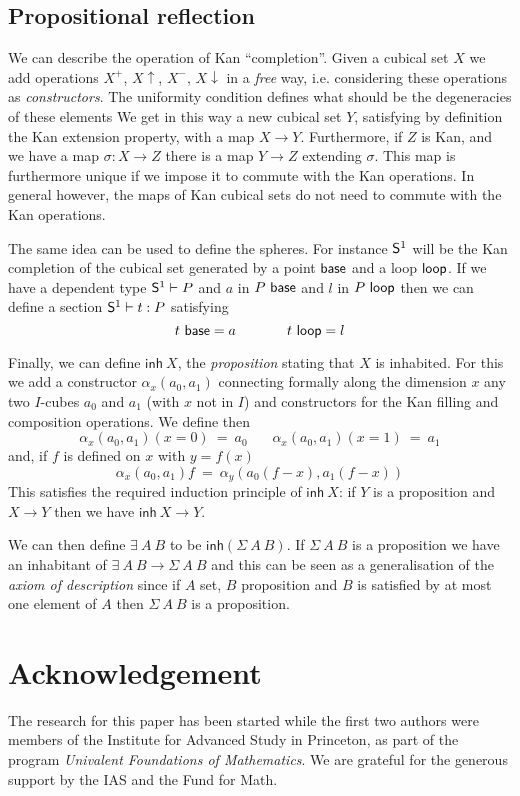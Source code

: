 \documentclass[10pt,a4paper]{article}
\newcommand{\inh}{\mathsf{inh}}
\newcommand{\Sph}{{\sf S}^1}
\begin{document}
\subsection{Propositional reflection}

 We can describe the operation of Kan ``completion''. Given a cubical set $X$ we add
operations $X^+$, $X\uparrow$, $X^-$, $X\downarrow$ in a {\em free} way, i.e.
considering these operations as {\em constructors}.
 The uniformity condition defines what should be the degeneracies of these elements
We get in this way a new cubical set $Y$, satisfying by definition the Kan extension
property, with a map $X\to Y$. Furthermore, if $Z$ is Kan, and we have a map
$\sigma:X\to Z$ there is a map $Y\to Z$ extending $\sigma$.
This map is furthermore unique if we impose
it to commute with the Kan  operations.
In general however, the maps of Kan cubical sets do not need to commute with the Kan operations.

 The same idea can be used to define the spheres. For instance $\Sph$ will be the
Kan completion of the cubical set generated by a point ${\sf base}$ and a loop ${\sf loop}$.
If we have a dependent type $\Sph\vdash P$ and $a$ in $P~{\sf base}$ and $l$ in $P~{\sf loop}$
then we can define a section $\Sph\vdash t:P$ satisfying
$$
t~{\sf base} = a~~~~~~~~~~~t~{\sf loop} = l
$$

 Finally, we can define $\inh~X$, the {\em proposition} stating that $X$ is inhabited.
For this we add a constructor $\alpha_x(a_0,a_1)$ connecting formally along the dimension $x$
any two $I$-cubes  $a_0$ and $a_1$ (with $x$ not in $I$) and constructors for the Kan filling
and composition operations. We define then
$$\alpha_x(a_0,a_1)(x=0) ~=~ a_0~~~~~~~~\alpha_x(a_0,a_1)(x=1) ~=~ a_1$$
and, if $f$ is defined on $x$ with $y=f(x)$
$$\alpha_x(a_0,a_1)f ~=~ \alpha_y(a_0(f-x),a_1(f-x))$$
 This satisfies the required induction principle of $\inh~X$: if $Y$ is a proposition
and $X\to Y$ then we have $\inh~X\to Y$.

 We can then define $\exists~A~B$ to be $\inh(\Sigma~A~B)$. If $\Sigma~A~B$ is a proposition we have
an inhabitant of $\exists~A~B\to \Sigma~ A~B$ and this can be seen as a generalisation of
the {\em axiom of description} since if $A$ set, $B$ proposition and $B$ is satisfied by at most
one element of $A$ then $\Sigma~A~B$ is a proposition.

\section*{Acknowledgement}
The research for this paper has been started while the first two
authors were members of the Institute for Advanced Study in Princeton,
as part of the program \emph{Univalent Foundations of Mathematics}.
We are grateful for the generous support by the IAS and the Fund for Math.
\end{document}
